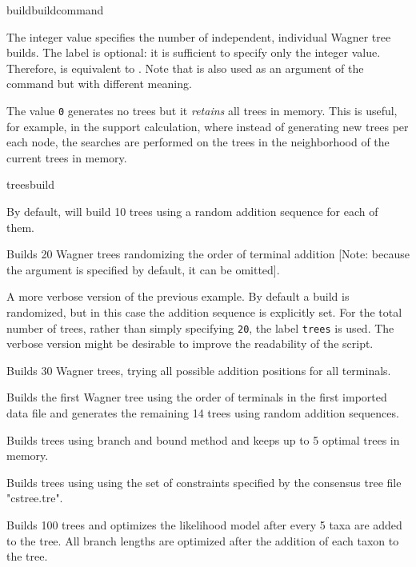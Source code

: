\begin{command}{build}{buildcommand}
\begin{arguments}
{The integer value specifies the number of independent, individual
Wagner tree builds. The label  is optional: it
is sufficient to specify only the integer value. Therefore,
 is equivalent to .
Note that  is also used as an argument of the
command  but with different meaning.

\setlength{\parindent}{0.5cm}                
\indent 
The value \texttt{0} generates no trees but it \emph{retains} all
trees in memory. This is useful, for example, in the 
support calculation, where instead of generating new trees per each
node, the searches are performed on the trees in the neighborhood
of the current trees in memory.} {treesbuild}

\end{arguments}

{By default, \poy will build 10 trees using a random addition
sequence for each of them.}

\begin{poyexamples}
{Builds 20 Wagner trees randomizing the order of terminal
addition [Note: because the argument  
is specified by default, it can be omitted].}

{A more verbose version of the previous example. By default a build
is randomized, but in this case the addition sequence is explicitly
set. For the total number of trees, rather than simply specifying
\texttt{20}, the label \texttt{trees} is used. The verbose version
might be desirable to improve the readability of the script.}

{Builds 30 Wagner trees, trying all possible addition positions for
all terminals}.

{Builds the first Wagner tree using the order of terminals in the first
imported data file and generates the remaining
14 trees using random addition sequences.}

{Builds trees using branch and bound method and keeps up to
5 optimal trees in memory.}

{Builds trees using using the set of constraints specified by the
consensus tree file "cstree.tre".}

{Builds 100 trees and optimizes the likelihood model after every 5
taxa are added to the tree. All branch lengths are optimized after
the addition of each taxon to the tree.}

\end{poyexamples}

\end{command}

